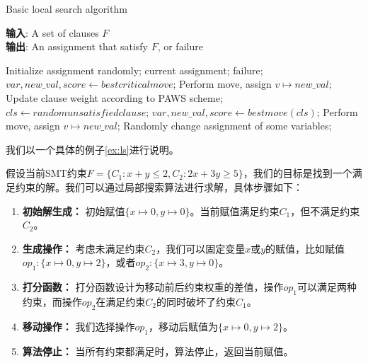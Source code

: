 \begin{algorithm}[t]
    \caption{Basic local search algorithm}
    \label{alg:basic}
    \textbf{输入}: A set of clauses $F$\\
    \textbf{输出}: An assignment that satisfy $F$, or failure\\
    
    \begin{algorithmic}[1] %
        \Statex \hrulefill
        \STATE Initialize assignment randomly;
        \While{\top}
                \RETURN current assignment;
            \ENDIF
                \RETURN failure;
            \ENDIF
            \STATE $var, new\_val, score \leftarrow best critical move$;
                Perform move, assign $v \mapsto new\_val$;
            \ELSE
                \STATE Update clause weight according to PAWS scheme;
                \STATE $cls \leftarrow random unsatisfied clause$;
                \STATE $var, new\_val, score \leftarrow best move(cls)$;
                    Perform move, assign $v \mapsto new\_val$;
                \ENDIF
                \STATE Randomly change assignment of some variables;
                \ENDIF
            \ENDIF
        \EndWhile
    \end{algorithmic}
\end{algorithm}

我们以一个具体的例子\ref{ex:ls}进行说明。
\begin{example}
    假设当前SMT约束$F = \{C_1: x + y \leq 2, C_2: 2x + 3y \geq 5\}$，我们的目标是找到一个满足约束的解。我们可以通过局部搜索算法进行求解，具体步骤如下：

    \begin{enumerate}
        \item \textbf{初始解生成：} 初始赋值$\{x \mapsto 0, y \mapsto 0\}$。当前赋值满足约束$C_1$，但不满足约束$C_2$。
        \item \textbf{生成操作：} 考虑未满足约束$C_2$，我们可以固定变量$x$或$y$的赋值，比如赋值$op_1: \{x \mapsto 0, y \mapsto 2\}$，或者$op_2: \{x \mapsto 3, y \mapsto 0\}$。
        \item \textbf{打分函数：} 打分函数设计为移动前后约束权重的差值，操作$op_1$可以满足两种约束，而操作$op_2$在满足约束$C_2$的同时破坏了约束$C_1$。
        \item \textbf{移动操作：} 我们选择操作$op_1$，移动后赋值为$\{x \mapsto 0, y \mapsto 2\}$。
        \item \textbf{算法停止：} 当所有约束都满足时，算法停止，返回当前赋值。
    \end{enumerate}
\label{ex:ls}
\end{example}

